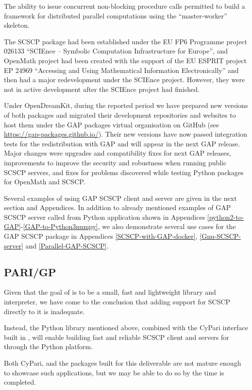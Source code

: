 \documentclass{deliverablereport}
\begin{document}
The ability to issue concurrent non-blocking procedure calls 
permitted to build a framework for distributed parallel computations
using the ``master-worker'' skeleton.

The SCSCP package had been established under the
EU FP6 Programme project 026133 
``SCIEnce -- Symbolic Computation Infrastructure for Europe'',
and OpenMath project had been created with the support of
the EU ESPRIT project EP 24969 
``Accessing and Using Mathematical Information Electronically''
and then had a major redevelopment under the SCIEnce project.
However, they were not in active development after the SCIEnce
project had finished.

Under  OpenDreamKit,
during the reported period we have prepared new versions of 
both packages and migrated their development repositories and
websites to host them under the GAP packages virtual organisation 
on GitHub (see \url{https://gap-packages.github.io/}).
Their new versions have now passed integration tests for the redistribution
with GAP and will appear in the next GAP release. Major changes
were upgrades and compatibility fixes for next GAP releases,
improvements to improve the security and robustness when
running public SCSCP servers, and fixes for problems discovered
while testing Python packages for OpenMath and SCSCP.

Several examples of using GAP SCSCP client and server are given
in the next section and Appendices. In addition to 
already mentioned examples of GAP SCSCP server called from
Python application shown in Appendices \ref{python2-to-GAP}-\ref{GAP-to-Python3numpy},
we also demonstrate several use cases for the GAP SCSCP package 
in Appendices \ref{SCSCP-with-GAP-docker}, \ref{Gnu-SCSCP-server}
and \ref{Parallel-GAP-SCSCP}.


\subsection{PARI/GP}

Given that the goal of \Pari is to be a small, fast and lightweight
library and interpreter, we have come to the conclusion that adding
support for SCSCP directly to it is inadequate.

Instead, the Python library mentioned above, combined with the CyPari
interface built in , will enable
building fast and reliable SCSCP client and servers for \Pari through
the Python platform.

Both CyPari, and the packages built for this deliverable are not
mature enough to showcase such applications, but we may be able to do
so by the time  is completed.
\end{document}
